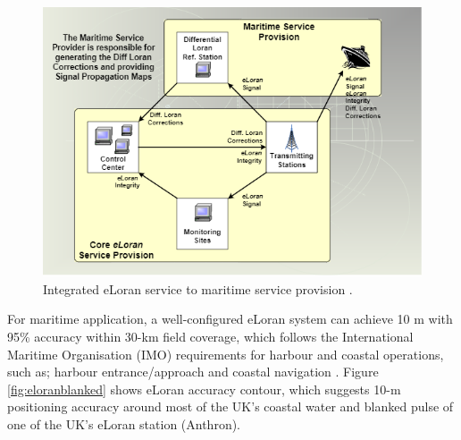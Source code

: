 \begin{figure}[!ht]
    \centering
    \includegraphics[scale=0.7]{Figures/ELORAN_maritime_app.PNG}
    \caption{Integrated eLoran service to maritime service provision \cite{InternationalLORANAssociation2007EnhancedApril}.}
    \label{fig:eloranmaritimeapp}
\end{figure}

\noindent For maritime application, a well-configured eLoran system can achieve 10 m with 95\% accuracy within 30-km field coverage, which follows the International Maritime Organisation (IMO) requirements for harbour and coastal operations, such as; harbour entrance/approach and coastal navigation \cite{SharedTutorial}\cite{Son2020ELoran:Areas}\cite{SafarAIONS}. Figure \ref{fig:eloranblanked} shows eLoran accuracy contour, which suggests 10-m positioning accuracy around most of the UK's coastal water and blanked pulse of one of the UK's eLoran station (Anthron).\\


